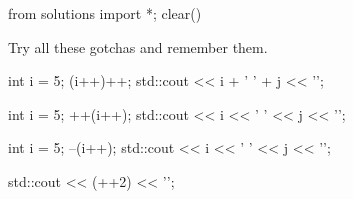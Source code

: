 \begin{python0}
from solutions import *; clear()
\end{python0}

Try all these gotchas and remember them.
\begin{console}
int i = 5;
(i++)++;
std::cout << i + ' ' + j << '\n';
\end{console}
\begin{console}
int i = 5;
++(i++);
std::cout << i << ' ' << j << '\n';
\end{console}
\begin{console}
int i = 5;
--(i++);
std::cout << i << ' ' << j << '\n';
\end{console}
\begin{console}
std::cout << (++2) << '\n';
\end{console}

